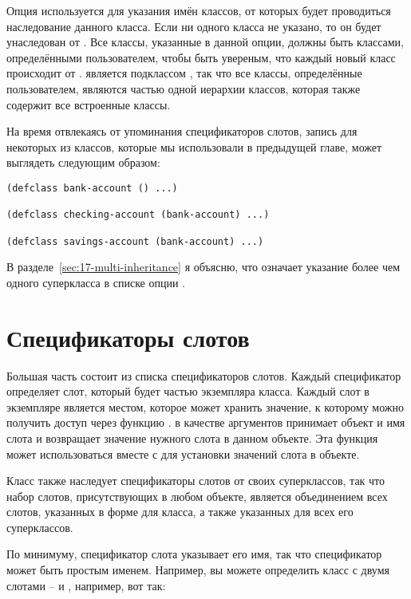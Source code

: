 Опция  используется для указания имён классов, от которых
будет проводиться наследование данного класса.  Если ни одного класса не указано, то он
будет унаследован от .  Все классы, указанные в данной опции, должны
быть классами, определёнными пользователем, чтобы быть увереным, что каждый новый класс
происходит от .   является подклассом
, так что все классы, определённые пользователем, являются частью одной иерархии
классов, которая также содержит все встроенные классы.

На время отвлекаясь от упоминания спецификаторов слотов, запись  для
некоторых из классов, которые мы использовали в предыдущей главе, может выглядеть
следующим образом:

\begin{lstlisting}
(defclass bank-account () ...)

(defclass checking-account (bank-account) ...)

(defclass savings-account (bank-account) ...)
\end{lstlisting}

В разделе~\ref{sec:17-multi-inheritance} я объясню, что означает указание более чем одного
суперкласса в списке опции .

\section{Спецификаторы слотов}

Большая часть  состоит из списка спецификаторов слотов.  Каждый
спецификатор определяет слот, который будет частью экземпляра класса.  Каждый слот в
экземпляре является местом, которое может хранить значение, к которому можно получить
доступ через функцию .  в качестве аргументов принимает
объект и имя слота и возвращает значение нужного слота в данном объекте.  Эта функция
может использоваться вместе с  для установки значений слота в объекте.

Класс также наследует спецификаторы слотов от своих суперклассов, так что набор слотов,
присутствующих в любом объекте, является объединением всех слотов, указанных в форме
 для класса, а также указанных для всех его суперклассов.

По минимуму, спецификатор слота указывает его имя, так что спецификатор может быть простым
именем.  Например, вы можете определить класс  с двумя слотами --
 и , например, вот так:

